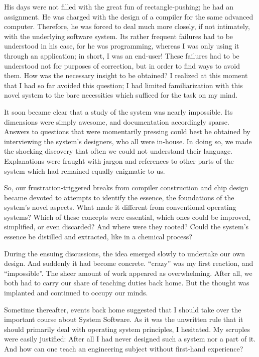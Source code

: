 His days were not filled with the great fun of rectangle-pushing; he
had an assignment. He was charged with the design of a compiler for
the same advanced computer. Therefore, he was forced to deal much more
closely, if not intimately, with the underlying software system. Its
rather frequent failures had to be understood in his case, for he was
programming, whereas I was only using it through an application; in
short, I was an end-user! These failures had to be understood not for
purposes of correction, but in order to find ways to avoid them. How
was the necessary insight to be obtained? I realized at this moment
that I had so far avoided this question; I had limited familiarization
with this novel system to the bare necessities which sufficed for the
task on my mind.

It soon became clear that a study of the system was nearly
impossible. Its dimensions were simply awesome, and documentation
accordingly sparse. Answers to questions that were momentarily
pressing could best be obtained by interviewing the system's
designers, who all were in-house. In doing so, we made the shocking
discovery that often we could not understand their
language. Explanations were fraught with jargon and references to
other parts of the system which had remained equally enigmatic to us.

So, our frustration-triggered breaks from compiler construction and
chip design became devoted to attempts to identify the essence, the
foundations of the system's novel aspects. What made it different from
conventional operating systems? Which of these concepts were
essential, which ones could be improved, simplified, or even
discarded? And where were they rooted? Could the system's essence be
distilled and extracted, like in a chemical process?

During the ensuing discussions, the idea emerged slowly to undertake
our own design. And suddenly it had become concrete. ``crazy'' was my
first reaction, and ``impossible''. The sheer amount of work appeared as
overwhelming. After all, we both had to carry our share of teaching
duties back home. But the thought was implanted and continued to
occupy our minds.

Sometime thereafter, events back home suggested that I should take
over the important course about System Software. As it was the
unwritten rule that it should primarily deal with operating system
principles, I hesitated. My scruples were easily justified: After all
I had never designed such a system nor a part of it. And how can one
teach an engineering subject without first-hand experience?

